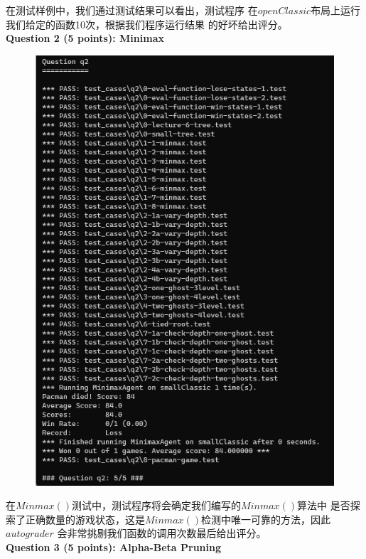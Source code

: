 \documentclass[a4paper,12pt,UTF8]{article}
\begin{document}
\begin{flushleft}
{    \normalsize{
        \hspace{1cm}在测试样例中，我们通过测试结果可以看出，测试程序
        在$openClassic$布局上运行我们给定的函数10次，根据我们程序运行结果
        的好坏给出评分。\\
    }
    \newpage
    \large{
        \hspace{1cm}\textbf{
            Question 2 (5 points): Minimax\\
        }
    }
    \begin{figure}[h]
        \centering
        \includegraphics[width=12cm,height=16cm]{2.png}
    \end{figure}
    \normalsize{
        \hspace{1cm}在$Minmax()$测试中，测试程序将会确定我们编写的$Minmax()$算法中
        是否探索了正确数量的游戏状态，这是$Minmax()$检测中唯一可靠的方法，因此$autograder$
        会非常挑剔我们函数的调用次数最后给出评分。\\
    }
    \newpage
    \large{
        \hspace{1cm}\textbf{
            Question 3 (5 points): Alpha-Beta Pruning\\
}}}
\end{flushleft}
\end{document}
